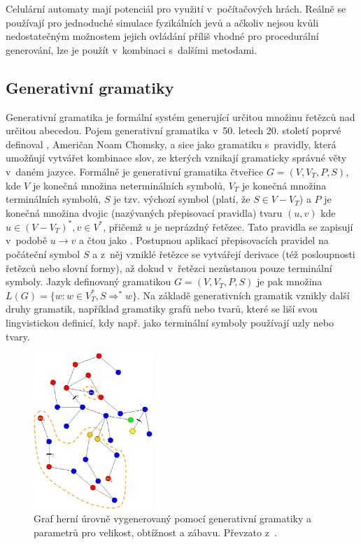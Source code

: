 \par
Celulární automaty mají potenciál pro využití v~počítačových hrách.
Reálně se používají pro jednoduché simulace fyzikálních jevů a ačkoliv nejsou kvůli nedostatečným možnostem jejich ovládání příliš vhodné pro procedurální generování, lze je použít v~kombinaci s~dalšími metodami.


\subsection{Generativní gramatiky}


Generativní gramatika je formální systém generující určitou množinu řetězců nad určitou abecedou.
Pojem generativní gramatika v~50. letech 20. století poprvé definoval , Američan Noam Chomsky, a sice jako gramatiku s~pravidly, která umožňují vytvářet kombinace slov, ze kterých vznikají gramaticky správné věty v~daném jazyce.
Formálně je generativní gramatika čtveřice $G=(V, V_{T}, P, S)$, kde $V$ je konečná množina neterminálních symbolů, $V_{T}$ je konečná množina terminálních symbolů, $S$ je tzv. výchozí symbol (platí, že $S \in V-V_{T}$) a $P$ je konečná množina dvojic (nazývaných přepisovací pravidla) tvaru $(u, v)$ kde $u \in (V-V_{T})^*, v \in V^*$, přičemž $u$ je neprázdný řetězec.
Tato pravidla se zapisují v~podobě $u \rightarrow v$ a čtou jako .
Postupnou aplikací přepisovacích pravidel na počáteční symbol $S$ a z~něj vzniklé řetězce se vytvářejí derivace (též posloupnosti řetězců nebo slovní formy), až dokud v~řetězci nezůstanou pouze terminální symboly.
Jazyk definovaný gramatikou $G=(V, V_{T}, P, S)$ je pak množina $L(G) = \{w: w \in V^*_T, S \Rightarrow^*w\}$\cite{lit:mat_popis_jazyku}.
Na základě generativních gramatik vznikly další druhy gramatik, například gramatiky grafů nebo tvarů, které se liší svou lingvistickou definicí, kdy např. jako terminální symboly používají uzly nebo tvary.
\par
\begin{figure}[hbt]
    \centering
    \includegraphics[width=0.4\textwidth]{obrazky/graph_adams.png}
    \caption{Graf herní úrovně vygenerovaný pomocí generativní gramatiky a parametrů pro velikost, obtížnost a zábavu. Převzato z~\cite{lit:graph_adams}.}
    \label{img:graph_adams}
\end{figure}
